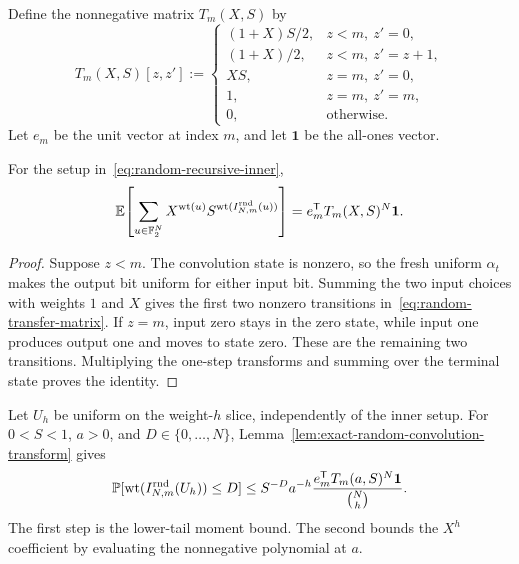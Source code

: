 Define the nonnegative matrix $T_m(X,S)$ by
\begin{equation}
  T_m(X,S)[z,z']
  :=
  \begin{cases}
    (1+X)S/2, & z<m,\ z'=0,\\
    (1+X)/2, & z<m,\ z'=z+1,\\
    XS, & z=m,\ z'=0,\\
    1, & z=m,\ z'=m,\\
    0, & \text{otherwise}.
  \end{cases}
  \label{eq:random-transfer-matrix}
\end{equation}
Let $e_m$ be the unit vector at index $m$, and let $\boldsymbol 1$ be the
all-ones vector.

\begin{lemma}
\label{lem:exact-random-convolution-transform}
For the setup in~\eqref{eq:random-recursive-inner},
\begin{equation}
  \mathbb E\!\left[
    \sum_{u\in\mathbb F_2^N}
    X^{\operatorname{wt}(u)}S^{\operatorname{wt}(I_{N,m}^{\mathrm{rnd}}(u))}
  \right]
  =
  e_m^{\mathsf T}T_m(X,S)^N\boldsymbol 1.
  \label{eq:exact-random-convolution-transform}
\end{equation}
\end{lemma}

\begin{proof}
Suppose $z<m$. The convolution state is nonzero, so the fresh uniform
$\alpha_t$ makes the output bit uniform for either input bit. Summing the two
input choices with weights $1$ and $X$ gives the first two nonzero transitions
in~\eqref{eq:random-transfer-matrix}. If $z=m$, input zero stays in the zero
state, while input one produces output one and moves to state zero. These are
the remaining two transitions. Multiplying the one-step transforms and
summing over the terminal state proves the identity.
\end{proof}

Let $U_h$ be uniform on the weight-$h$ slice, independently of the inner
setup. For $0<S<1$, $a>0$, and $D\in\{0,\ldots,N\}$,
Lemma~\ref{lem:exact-random-convolution-transform} gives
\begin{equation}
  \mathbb P[\operatorname{wt}(I_{N,m}^{\mathrm{rnd}}(U_h))\le D]
  \le
  S^{-D}a^{-h}
  \frac{e_m^{\mathsf T}T_m(a,S)^N\boldsymbol 1}{\binom Nh}.
  \label{eq:random-convolution-tail}
\end{equation}
The first step is the lower-tail moment bound. The second bounds the
$X^h$ coefficient by evaluating the nonnegative polynomial at $a$.

